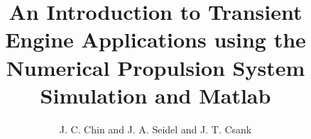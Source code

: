 \documentclass[]             %
{NASA}                       %
\title{An Introduction to Transient Engine Applications using the Numerical Propulsion System Simulation and Matlab}
\author{J. C. Chin and J. A. Seidel and J. T. Csank} %
\begin{document}
\tableofcontents
\listoffigures
\listoftables




\cite{Turbofan}
\cite{NonlinearDynamic}
\cite{MatlabOOP}
\cite{Volume Dynamic}
\cite{TTECTrA}
\cite{NPSS}




\end{document}

